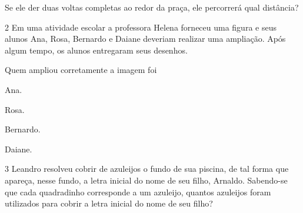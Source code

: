 Se ele der duas voltas completas ao redor da praça, ele percorrerá qual
distância?



\num{2} Em uma atividade escolar a professora Helena forneceu uma figura e
seus alunos Ana, Rosa, Bernardo e Daiane deveriam realizar uma ampliação. Após algum tempo, os alunos entregaram seus desenhos.


Quem ampliou corretamente a imagem foi

\begin{escolha}
\item
  Ana.
\item
  Rosa.
\item
  Bernardo.
\item
  Daiane.
\end{escolha}


\num{3} Leandro resolveu cobrir de azuleijos o fundo de sua piscina, de tal
forma que apareça, nesse fundo, a letra inicial do nome de seu filho,
Arnaldo. Sabendo-se que cada quadradinho corresponde a um azuleijo,
quantos azuleijos foram utilizados para cobrir a letra inicial do nome
de seu filho?


